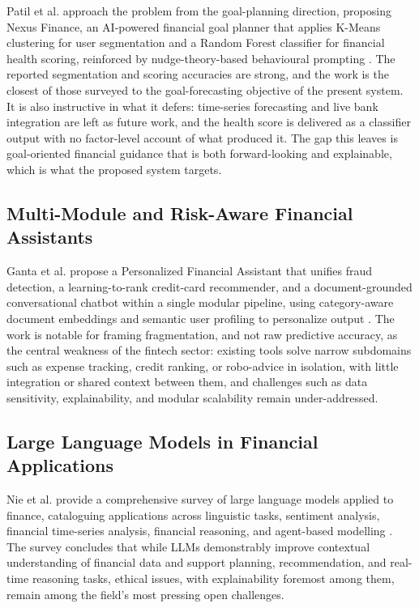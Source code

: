 \documentclass[conference]{IEEEtran}
\begin{document}
Patil et al. approach the problem from the goal-planning direction, proposing Nexus Finance, an AI-powered financial goal planner that applies K-Means clustering for user segmentation and a Random Forest classifier for financial health scoring, reinforced by nudge-theory-based behavioural prompting \cite{patil2026nexus}. The reported segmentation and scoring accuracies are strong, and the work is the closest of those surveyed to the goal-forecasting objective of the present system. It is also instructive in what it defers: time-series forecasting and live bank integration are left as future work, and the health score is delivered as a classifier output with no factor-level account of what produced it. The gap this leaves is goal-oriented financial guidance that is both forward-looking and explainable, which is what the proposed system targets.

\subsection{Multi-Module and Risk-Aware Financial Assistants}

Ganta et al. propose a Personalized Financial Assistant that unifies fraud detection, a learning-to-rank credit-card recommender, and a document-grounded conversational chatbot within a single modular pipeline, using category-aware document embeddings and semantic user profiling to personalize output \cite{ganta2025multimodule}. The work is notable for framing fragmentation, and not raw predictive accuracy, as the central weakness of the fintech sector: existing tools solve narrow subdomains such as expense tracking, credit ranking, or robo-advice in isolation, with little integration or shared context between them, and challenges such as data sensitivity, explainability, and modular scalability remain under-addressed.

\subsection{Large Language Models in Financial Applications}

Nie et al. provide a comprehensive survey of large language models applied to finance, cataloguing applications across linguistic tasks, sentiment analysis, financial time-series analysis, financial reasoning, and agent-based modelling \cite{nie2024survey}. The survey concludes that while LLMs demonstrably improve contextual understanding of financial data and support planning, recommendation, and real-time reasoning tasks, ethical issues, with explainability foremost among them, remain among the field's most pressing open challenges.
\end{document}

